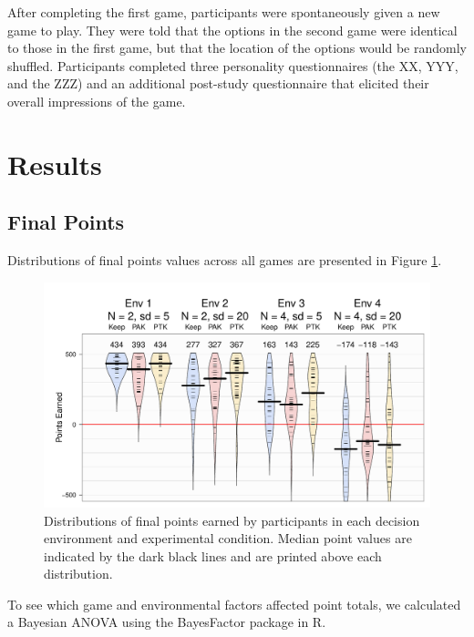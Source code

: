 \documentclass[a4paper,doc,natbib,floatsintext]{apa6}\usepackage[]{graphicx}\usepackage[]{color}
\begin{document}
After completing the first game, participants were spontaneously given a new game to play. They were told that the options in the second game were identical to those in the first game, but that the location of the options would be randomly shuffled. Participants completed three personality questionnaires (the XX, YYY, and the ZZZ) and an additional post-study questionnaire that elicited their overall impressions of the game.

\section{Results}

\subsection{Final Points}

Distributions of final points values across all games are presented in Figure \ref{fig:pointbeans}.




\begin{figure}
\includegraphics[width=\columnwidth]{figures/pointbeans}
\caption{Distributions of final points earned by participants in each decision environment and experimental condition. Median point values are indicated by the dark black lines and are printed above each distribution.}
\label{fig:pointbeans}
\end{figure}

To see which game and environmental factors affected point totals, we calculated a Bayesian ANOVA using the BayesFactor package in R.
\end{document}

